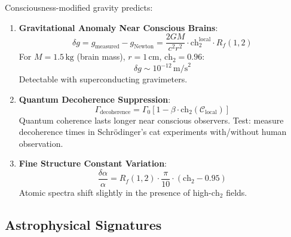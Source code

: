 \begin{proposition}\label{prop:lab-tests}
Consciousness-modified gravity predicts:

\begin{enumerate}
\item \textbf{Gravitational Anomaly Near Conscious Brains}:
\begin{equation}
\delta g = g_{\text{measured}} - g_{\text{Newton}} = \frac{2GM}{c^2r^2} \cdot \text{ch}_2^{\text{local}} \cdot R_f(1,2)
\end{equation}
For $M = 1.5 \, \text{kg}$ (brain mass), $r = 1 \, \text{cm}$, $\text{ch}_2 = 0.96$:
\begin{equation}
\delta g \sim 10^{-12} \, \text{m/s}^2
\end{equation}
Detectable with superconducting gravimeters\cite{niebauer1995,van_camp2017,peters1999}.

\item \textbf{Quantum Decoherence Suppression}:
\begin{equation}
\Gamma_{\text{decoherence}} = \Gamma_0 \left[ 1 - \beta \cdot \text{ch}_2(\mathcal{C}_{\text{local}}) \right]
\end{equation}
Quantum coherence lasts longer near conscious observers. Test: measure decoherence times in Schrödinger's cat experiments with/without human observation.

\item \textbf{Fine Structure Constant Variation}:
\begin{equation}
\frac{\delta \alpha}{\alpha} = R_f(1,2) \cdot \frac{\pi}{10} \cdot (\text{ch}_2 - 0.95)
\end{equation}
Atomic spectra shift slightly in the presence of high-$\text{ch}_2$ fields\cite{webb2001,uzan2011,rosenband2008}.
\end{enumerate}
\end{proposition}

\subsection{Astrophysical Signatures}

